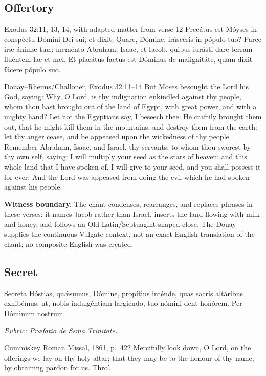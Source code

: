 \subsection*{Offertory }
\begin{appointedlatin}{Exodus 32:11, 13, 14, with adapted matter from verse 12}
Precátus est Móyses in conspéctu Dómini Dei sui, et dixit: Quare, Dómine,
irásceris in pópulo tuo? Parce iræ ánimæ tuæ: meménto Abraham, Isaac, et
Iacob, quibus iurásti dare terram fluéntem lac et mel. Et placátus factus est
Dóminus de malignitáte, quam dixit fácere pópulo suo.
\end{appointedlatin}
\begin{namedtranslation}{Douay--Rheims/Challoner, Exodus 32:11--14}
But Moses besought the Lord his God, saying: Why, O Lord, is thy indignation
enkindled against thy people, whom thou hast brought out of the land of Egypt,
with great power, and with a mighty hand? Let not the Egyptians say, I beseech
thee: He craftily brought them out, that he might kill them in the mountains,
and destroy them from the earth: let thy anger cease, and be appeased upon the
wickedness of thy people. Remember Abraham, Isaac, and Israel, thy servants,
to whom thou sworest by thy own self, saying: I will multiply your seed as the
stars of heaven: and this whole land that I have spoken of, I will give to your
seed, and you shall possess it for ever: And the Lord was appeased from doing
the evil which he had spoken against his people.

\textbf{Witness boundary.} The chant condenses, rearranges, and replaces
phrases in these verses: it names Jacob rather than Israel, inserts the land
flowing with milk and honey, and follows an Old-Latin/Septuagint-shaped close.
The Douay supplies the continuous Vulgate context, not an exact English
translation of the chant; no composite English was created.
\end{namedtranslation}

\elementguard
\subsection*{Secret }
\begin{appointedlatin}{Secreta}
Hóstias, quǽsumus, Dómine, propítius inténde, quas sacris altáribus
exhibémus: ut, nobis indulgéntiam largiéndo, tuo nómini dent honórem. Per
Dóminum nostrum.

\emph{Rubric: Præfatio de Ssma Trinitate.}
\end{appointedlatin}
\begin{namedtranslation}{Cummiskey Roman Missal, 1861, p.~422}
Mercifully look down, O Lord, on the offerings we lay on thy holy altar; that
they may be to the honour of thy name, by obtaining pardon for us. Thro'.
\end{namedtranslation}


